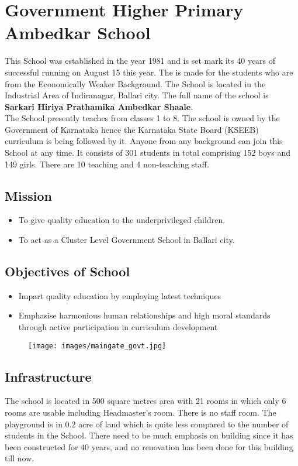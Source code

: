 \setcounter{page}{1}
\section{Government Higher Primary Ambedkar School}
This School was established in the year 1981 and is set mark its 40 years of successful running on August 15 this year. The is made for the students who are from the Economically Weaker Background. The School is located in the Industrial Area of Indiranagar,  Ballari city. The full name of the school is \textbf{Sarkari Hiriya Prathamika Ambedkar Shaale}.\\
\noindent The School presently teaches from classes 1 to 8. The school is owned by the Government of Karnataka hence the Karnataka State Board (KSEEB) curriculum is being followed by it. Anyone from any background can join this School at any time. It consists of 301 students in total comprising 152 boys and 149 girls. There are 10 teaching and 4 non-teaching staff. 
\subsection{Mission}
\begin{itemize}
    \item To give quality education to the underprivileged children. 
    \item To act as a Cluster Level Government School in Ballari city.
\end{itemize}
\subsection{Objectives of School}
\begin{itemize}
\item Impart quality education by employing latest techniques
\item Emphasise harmonious human relationships and high moral standards through active participation in curriculum development 
\end{itemize}

\begin{figure}[H]
    \centering
    \texttt{[image: images/maingate\_govt.jpg]}
\end{figure}

\subsection{Infrastructure}
The school is located in 500 square metres area with 21 rooms in which only 6 rooms are usable including Headmaster's room. There is no staff room. The playground is in 0.2 acre of land which is quite less compared to the number of students in the School. There need to be much emphasis on building since it has been constructed for 40 years, and no renovation has been done for this building till now. \\ 

